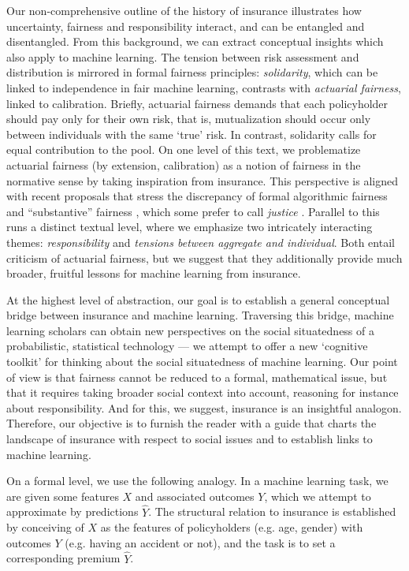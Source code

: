 \documentclass[11pt]{article} %
\makeatletter
\newcommand*{\eg}{e.g.\@\xspace}
\makeatother
\begin{document}
Our non-comprehensive outline of the history of insurance illustrates how uncertainty, fairness and responsibility interact, and can be entangled and disentangled. From this background, we can extract conceptual insights which also apply to machine learning.
The tension between risk assessment and distribution is mirrored in formal fairness principles: \textit{solidarity}, which can be linked to independence in fair machine learning, contrasts with \textit{actuarial fairness}, linked to calibration. Briefly, actuarial fairness demands that each policyholder should pay only for their own risk, that is, mutualization should occur only between individuals with the same `true' risk. In contrast, solidarity calls for equal contribution to the pool.
On one level of this text, we problematize actuarial fairness (by extension, calibration) as a notion of fairness in the normative sense by taking inspiration from insurance. This perspective is aligned with recent proposals that stress the discrepancy of formal algorithmic fairness and ``substantive'' fairness \citep{green2022escaping}, which some prefer to call \textit{justice} \citep{vredenburghfairness}.
Parallel to this runs a distinct textual level, where we emphasize two intricately interacting themes: \textit{responsibility} and \textit{tensions between aggregate and individual}. Both entail criticism of actuarial fairness, but we suggest that they additionally provide much broader, fruitful lessons for machine learning from insurance.

At the highest level of abstraction, our goal is to establish a general conceptual bridge between insurance and machine learning. Traversing this bridge, machine learning scholars can obtain new perspectives on the social situatedness of a probabilistic, statistical technology --- we attempt to offer a new `cognitive toolkit' for thinking about the social situatedness of machine learning. Our point of view is that fairness cannot be reduced to a formal, mathematical issue, but that it requires taking broader social context into account, reasoning for instance about responsibility. And for this, we suggest, insurance is an insightful analogon.  Therefore, our objective is to furnish the reader with a guide that charts the landscape of insurance with respect to social issues and to establish links to machine learning.

On a formal level, we use the following analogy. In a machine learning task, we are given some features $X$ and associated outcomes $Y$, which we attempt to approximate by predictions $\hat{Y}$. The structural relation to insurance is established by conceiving of $X$ as the features of policyholders (\eg age, gender) with outcomes $Y$ (\eg having an accident or not), and the task is to set a corresponding premium $\hat{Y}$.
\end{document}
